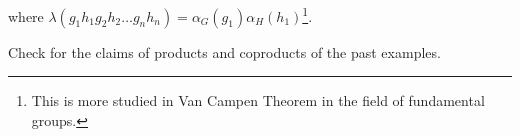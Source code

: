 \documentclass[../category_theory.tex]{subfiles}
\begin{document}
\begin{example}
\begin{itemize}
\begin{center}
\begin{tikzpicture}
			      \end{tikzpicture}
		      \end{center}
		      where \(\lambda (g_1h_1g_2h_2 \dotsc g_{n}h_{n})=\alpha_G(g_1)\alpha_H(h_1)\)\footnote{This is more studied in Van Campen Theorem in the field of fundamental groups.}.
	\end{itemize}
	\begin{exr}
		Check for the claims of products and coproducts of the past examples.
	\end{exr}

\end{example}
\end{document}
